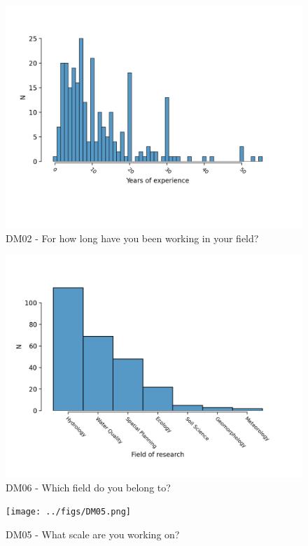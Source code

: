 \documentclass{article}
\begin{document}
\begin{figure}[!p]
    \centering
    \includegraphics[width=\textwidth]{../figs/DM02_01.png}
	\caption{DM02 - For how long have you been working in your field?}
    \label{fig:dm02}
\end{figure}

\begin{figure}[!p]
    \centering
    \includegraphics[width=\textwidth]{../figs/DM06.png}
	\caption{DM06 - Which field do you belong to?}
    \label{fig:dm06}
\end{figure}

\begin{figure}[!p]
    \centering
    \texttt{[image: ../figs/DM05.png]}
	\caption{DM05 - What scale are you working on?}
    \label{fig:dm05}
\end{figure}
\end{document}
